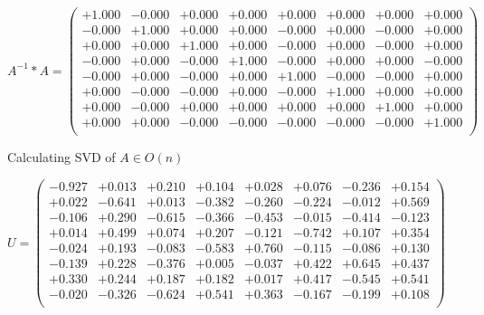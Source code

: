 \documentclass[9pt]{article}
\theoremstyle{plain}
\theoremstyle{definition}
\theoremstyle{remark}
\numberwithin{equation}{section}
\begin{document}
$A^{-1} *A = \left(
\begin{array}{
cccccccc}
+1.000 & -0.000 & +0.000 & +0.000 & +0.000 & +0.000 & +0.000 & +0.000 \\
-0.000 & +1.000 & +0.000 & +0.000 & -0.000 & +0.000 & -0.000 & +0.000 \\
+0.000 & +0.000 & +1.000 & +0.000 & -0.000 & +0.000 & -0.000 & +0.000 \\
-0.000 & +0.000 & -0.000 & +1.000 & -0.000 & +0.000 & +0.000 & -0.000 \\
-0.000 & +0.000 & -0.000 & +0.000 & +1.000 & -0.000 & -0.000 & +0.000 \\
+0.000 & -0.000 & -0.000 & +0.000 & -0.000 & +1.000 & +0.000 & +0.000 \\
+0.000 & -0.000 & +0.000 & +0.000 & +0.000 & +0.000 & +1.000 & +0.000 \\
+0.000 & +0.000 & -0.000 & -0.000 & -0.000 & -0.000 & -0.000 & +1.000 \\
\end{array}
\right)$ \newline 

Calculating SVD of  $A \in O(n)$

$U = \left(
\begin{array}{
cccccccc}
-0.927 & +0.013 & +0.210 & +0.104 & +0.028 & +0.076 & -0.236 & +0.154 \\
+0.022 & -0.641 & +0.013 & -0.382 & -0.260 & -0.224 & -0.012 & +0.569 \\
-0.106 & +0.290 & -0.615 & -0.366 & -0.453 & -0.015 & -0.414 & -0.123 \\
+0.014 & +0.499 & +0.074 & +0.207 & -0.121 & -0.742 & +0.107 & +0.354 \\
-0.024 & +0.193 & -0.083 & -0.583 & +0.760 & -0.115 & -0.086 & +0.130 \\
-0.139 & +0.228 & -0.376 & +0.005 & -0.037 & +0.422 & +0.645 & +0.437 \\
+0.330 & +0.244 & +0.187 & +0.182 & +0.017 & +0.417 & -0.545 & +0.541 \\
-0.020 & -0.326 & -0.624 & +0.541 & +0.363 & -0.167 & -0.199 & +0.108 \\
\end{array}
\right)$ \newline 
\end{document}
